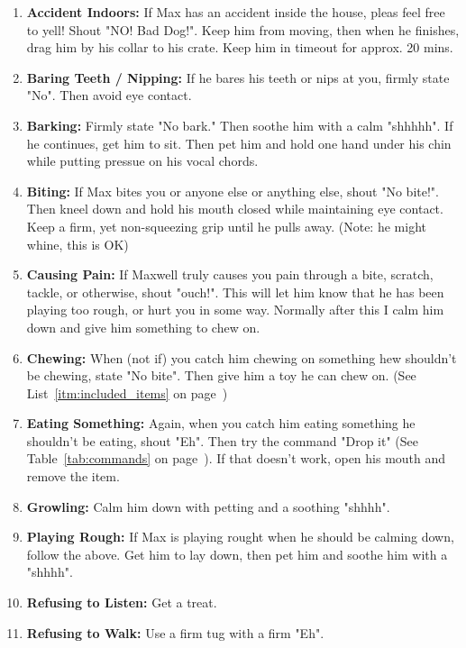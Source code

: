 \documentclass[pdftex,12pt]{article}
\begin{document}
\bigskip

\begin{enumerate}\label{itm:discipline}
    \item \textbf{Accident Indoors:} If Max has an accident inside the house,
        pleas feel free to yell! Shout "NO! Bad Dog!". Keep him from moving,
        then when he finishes, drag him by his collar to his crate. Keep him in
        timeout for approx. 20 mins.
    \item \textbf{Baring Teeth / Nipping:} If he bares his teeth or nips at you,
        firmly state "No". Then avoid eye contact.
    \item \textbf{Barking:} Firmly state "No bark." Then soothe him with a calm
        "shhhhh". If he continues, get him to sit. Then pet him and hold one
        hand under his chin while putting pressue on his vocal chords.
    \item \textbf{Biting:} If Max bites you or anyone else or anything else,
        shout "No bite!". Then kneel down and hold his mouth closed while
        maintaining eye contact. Keep a firm, yet non-squeezing grip until he
        pulls away. (Note: he might whine, this is OK)
    \item \textbf{Causing Pain:} If Maxwell truly causes you pain through a
        bite, scratch, tackle, or otherwise, shout "ouch!". This will let
        him know that he has been playing too rough, or hurt you in some way.
        Normally after this I calm him down and give him something to chew on.
    \item \textbf{Chewing:} When (not if) you catch him chewing on something hew
        shouldn't be chewing, state "No bite". Then give him a toy he can chew
        on. (See List~\ref{itm:included_items} on
        page~\pageref{itm:included_items})
    \item \textbf{Eating Something:} Again, when you catch him eating something
        he shouldn't be eating, shout "Eh". Then try the command "Drop it" (See
        Table~\ref{tab:commands} on page~\pageref{tab:commands}). If that
        doesn't work, open his mouth and remove the item.
    \item \textbf{Growling:} Calm him down with petting and a soothing "shhhh".
    \item \textbf{Playing Rough:} If Max is playing rought when he should be
        calming down, follow the above. Get him to lay down, then pet him and
        soothe him with a "shhhh".
    \item \textbf{Refusing to Listen:} Get a treat.
    \item \textbf{Refusing to Walk:} Use a firm tug with a firm "Eh".
\end{enumerate}
\end{document}
